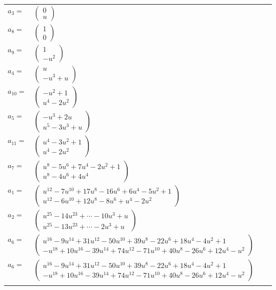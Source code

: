 \documentclass[1p]{elsarticle_modified}
\theoremstyle{definition}
\begin{document}
\begin{tabular}{m{7pt} m{180pt} m{7pt} m{180pt} }
\flushright $a_{3}=$&$\begin{pmatrix}0\\u\end{pmatrix}$ \\
\flushright $a_{8}=$&$\begin{pmatrix}1\\0\end{pmatrix}$ \\
\flushright $a_{9}=$&$\begin{pmatrix}1\\- u^2\end{pmatrix}$ \\
\flushright $a_{4}=$&$\begin{pmatrix}u\\- u^3+u\end{pmatrix}$ \\
\flushright $a_{10}=$&$\begin{pmatrix}- u^2+1\\u^4-2 u^2\end{pmatrix}$ \\
\flushright $a_{5}=$&$\begin{pmatrix}- u^3+2 u\\u^5-3 u^3+u\end{pmatrix}$ \\
\flushright $a_{11}=$&$\begin{pmatrix}u^4-3 u^2+1\\u^4-2 u^2\end{pmatrix}$ \\
\flushright $a_{7}=$&$\begin{pmatrix}u^8-5 u^6+7 u^4-2 u^2+1\\u^8-4 u^6+4 u^4\end{pmatrix}$ \\
\flushright $a_{1}=$&$\begin{pmatrix}u^{12}-7 u^{10}+17 u^8-16 u^6+6 u^4-5 u^2+1\\u^{12}-6 u^{10}+12 u^8-8 u^6+u^4-2 u^2\end{pmatrix}$ \\
\flushright $a_{2}=$&$\begin{pmatrix}u^{25}-14 u^{23}+\cdots-10 u^3+u\\u^{25}-13 u^{23}+\cdots-2 u^3+u\end{pmatrix}$ \\
\flushright $a_{6}=$&$\begin{pmatrix}u^{16}-9 u^{14}+31 u^{12}-50 u^{10}+39 u^8-22 u^6+18 u^4-4 u^2+1\\- u^{18}+10 u^{16}-39 u^{14}+74 u^{12}-71 u^{10}+40 u^8-26 u^6+12 u^4- u^2\end{pmatrix}$\\ \flushright $a_{6}=$&$\begin{pmatrix}u^{16}-9 u^{14}+31 u^{12}-50 u^{10}+39 u^8-22 u^6+18 u^4-4 u^2+1\\- u^{18}+10 u^{16}-39 u^{14}+74 u^{12}-71 u^{10}+40 u^8-26 u^6+12 u^4- u^2\end{pmatrix}$\\&\end{tabular}
\end{document}

